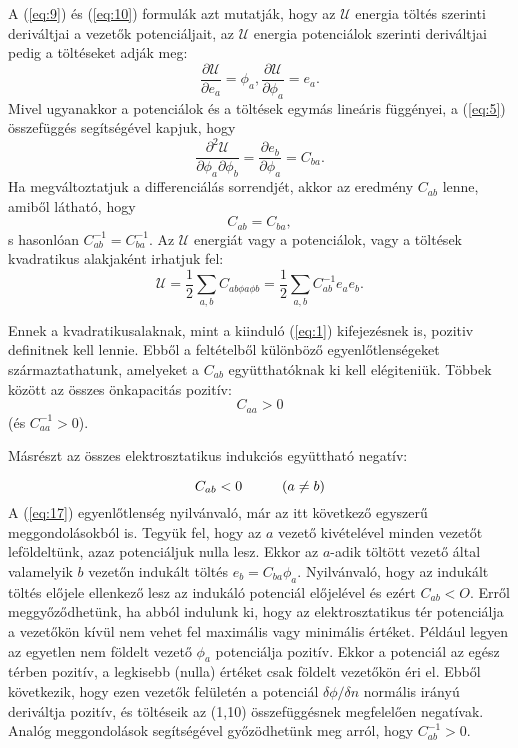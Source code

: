 \documentclass{article}
\begin{document}
A (\ref{eq:9}) és (\ref{eq:10}) formulák azt mutatják, hogy az $\mathcal{U}$ energia töltés szerinti deriváltjai a vezetők potenciáljait, az $\mathcal{U}$ energia potenciálok szerinti deriváltjai pedig a töltéseket adják meg:
\begin{equation} \label{eq:12}
    \frac{\partial \mathcal{U}}{\partial e_a} = \phi_a , \frac{\partial \mathcal{U}}{\partial \phi_a} = e_a .
\end{equation}
Mivel ugyanakkor a potenciálok és a töltések egymás lineáris függényei, a (\ref{eq:5}) összefüggés segítségével kapjuk, hogy
\begin{equation} \label{eq:13}
    \frac{\partial^2 \mathcal{U}}{\partial \phi_a \partial \phi_b} = \frac{\partial e_b}{\partial \phi_a} = C_{ba}.
\end{equation}
Ha megváltoztatjuk a differenciálás sorrendjét, akkor az eredmény $C_{ab}$ lenne, amiből látható, hogy
\begin{equation} \label{eq:14}
    C_{ab} = C_{ba},
\end{equation}
s hasonlóan $C^{-1}_{ab}=C^{-1}_{ba}$. Az $\mathcal{U}$ energiát vagy a potenciálok, vagy a töltések kvadratikus alakjaként irhatjuk fel:
\begin{equation} \label{eq:15}
    \mathcal{U} = \frac{1}{2} \sum\limits_{a, b} C_{ab \phi a \phi b} = \frac{1}{2} \sum\limits_{a, b} C^{-1}_{ab} e_a e_b .
\end{equation}

Ennek a kvadratikusalaknak, mint a kiinduló (\ref{eq:1}) kifejezésnek is, pozitiv definitnek kell lennie. Ebből a feltételből különböző egyenlőtlenségeket származtathatunk, amelyeket a $C_{ab}$ együtthatóknak ki kell elégiteniük. Többek között az összes önkapacitás pozitív:
\begin{equation} \label{eq:16}
    C_{aa} > 0
\end{equation}
(és $C^{-1}_{aa} > 0$).

Másrészt az összes elektrosztatikus indukciós együttható negatív:

\begin{equation} \label{eq:17}
    C_{ab} < 0 \hspace{1 cm} (a \neq b )
\end{equation}
A (\ref{eq:17}) egyenlőtlenség nyilvánvaló, már az itt következő egyszerű meggondolásokból is. Tegyük fel, hogy az $a$ vezető kivételével minden vezetőt leföldeltünk, azaz potenciáljuk nulla lesz. Ekkor az $a$-adik töltött vezető által valamelyik $b$ vezetőn indukált töltés $e_b = C_{ba}\phi_a$. Nyilvánvaló, hogy az indukált töltés előjele ellenkező lesz az indukáló potenciál előjelével és ezért $C_{ab} < O$. Erről meggyőződhetünk, ha abból indulunk ki, hogy az elektrosztatikus tér potenciálja a vezetőkön kívül nem vehet fel maximális vagy minimális értéket. Például legyen az egyetlen nem földelt vezető $\phi_a$ potenciálja pozitív. Ekkor a potenciál az egész térben pozitív, a legkisebb (nulla) értéket csak földelt vezetőkön éri el. Ebből következik, hogy ezen vezetők felületén a potenciál $\delta \phi / \delta n$ normális irányú deriváltja pozitív, és töltéseik az (1,10) összefüggésnek megfelelően negatívak. Analóg meggondolások segítségével győzödhetünk meg arról, hogy $C_{ab}^{-1} > 0$.
\end{document}
